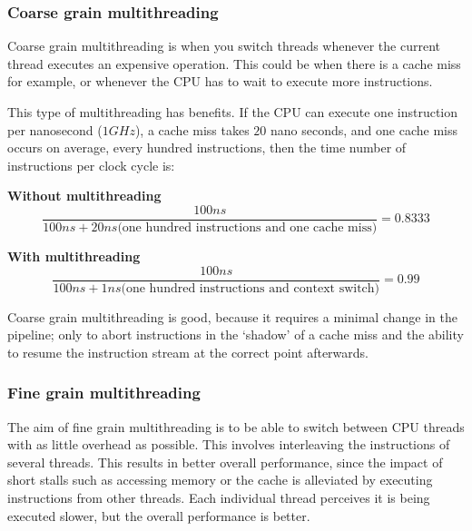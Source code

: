 \subsubsection{Coarse grain multithreading}

Coarse grain multithreading is when you switch threads whenever the current
thread executes an expensive operation. This could be when there is a cache miss
for example, or whenever the CPU has to wait to execute more instructions.

This type of multithreading has benefits. If the CPU can execute one instruction
per nanosecond ($1GHz$), a cache miss takes $20$ nano seconds, and one cache
miss occurs on average, every hundred instructions, then the time number of
instructions per clock cycle is:

\begin{description}
  \item \textbf{Without multithreading}
    \[
      \frac{100ns}{100ns + 20ns \text{(one hundred instructions and one cache miss)}} = 0.8333
    \]
  \item \textbf{With multithreading}
    \[
      \frac{100ns}{100ns + 1ns \text{(one hundred instructions and context switch)}} = 0.99
    \]
\end{description}

Coarse grain multithreading is good, because it requires a minimal change in the
pipeline; only to abort instructions in the `shadow' of a cache miss and the
ability to resume the instruction stream at the correct point afterwards.


\subsubsection{Fine grain multithreading}

The aim of fine grain multithreading is to be able to switch between CPU threads
with as little overhead as possible. This involves interleaving the instructions
of several threads. This results in better overall performance, since the impact
of short stalls such as accessing memory or the cache is alleviated by executing
instructions from other threads. Each individual thread perceives it is being
executed slower, but the overall performance is better.

